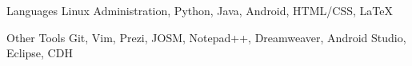 


\begin{cvskills}


\cvskill
{Languages} %
{Linux Administration, Python, Java, Android, HTML/CSS, LaTeX}





\cvskill
{Other Tools} %
{Git, Vim, Prezi, JOSM, Notepad++, Dreamweaver, Android Studio, Eclipse, CDH } %






\end{cvskills}